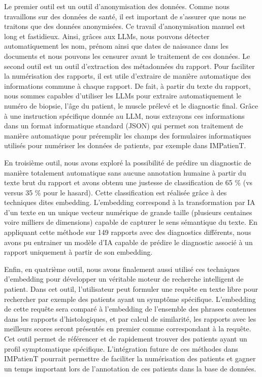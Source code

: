 Le premier outil est un outil d’anonymisation des données. Comme nous travaillons sur des données de santé, il est important de s’assurer que nous ne traitons que des données anonymisées. Ce travail d’anonymisation manuel est long et fastidieux. Ainsi, grâces aux LLMs, nous pouvons détecter automatiquement les nom, prénom ainsi que dates de naissance dans les documents et nous pouvons les censurer avant le traitement de ces données.
Le second outil est un outil d’extraction des métadonnées du rapport. Pour faciliter la numérisation des rapports, il est utile d’extraire de manière automatique des informations commune à chaque rapport. De fait, à partir du texte du rapport, nous sommes capables d’utiliser les LLMs pour extraire automatiquement le numéro de biopsie, l’âge du patient, le muscle prélevé et le diagnostic final. Grâce à une instruction spécifique donnée au LLM, nous extrayons ces informations dans un format informatique standard (JSON) qui permet son traitement de manière automatique pour préremplir les champs des formulaires informatiques utilisés pour numériser les données de patients, par exemple dans IMPatienT.

En troisième outil, nous avons exploré la possibilité de prédire un diagnostic de manière totalement automatique sans aucune annotation humaine à partir du texte brut du rapport et avons obtenu une justesse de classification de 65 \% (vs versus 35 \% pour le hasard). Cette classification est réalisée grâce à des techniques dites embedding. L’embedding correspond à la transformation par IA d’un texte en un unique vecteur numérique de grande taille (plusieurs centaines voire milliers de dimensions) capable de capturer le sens sémantique du texte. En appliquant cette méthode sur 149 rapports avec des diagnostics différents, nous avons pu entrainer un modèle d’IA capable de prédire le diagnostic associé à un rapport uniquement à partir de son embedding.

Enfin, en quatrième outil, nous avons finalement aussi  utilisé ces techniques d’embedding pour développer un véritable moteur de recherche intelligent de patient. Dans cet outil, l’utilisateur peut formuler une requête en texte libre pour rechercher par exemple des patients ayant un symptôme spécifique. L’embedding de cette requête sera comparé à l’embedding de l’ensemble des phrases contenues dans les rapports d’histologiques, et par calcul de similarité, les rapports avec les meilleurs scores seront présentés en premier comme correspondant à la requête. Cet outil permet de référencer et de rapidement trouver des patients ayant un profil symptomatique spécifique.
L’intégration future de ces méthodes dans IMPatienT pourrait permettre de faciliter la numérisation des patients et gagner un temps important lors de l’annotation de ces patients dans la base de données.

